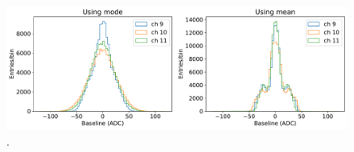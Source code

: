\documentclass[11pt,a4paper,english,oneside, pdf]{article}
\begin{document}
	\begin{figure}[!h]
		\begin{center}
			\includegraphics[width=\textwidth]{images/baselines_rel1_trigg_ch.pdf}
			\caption{.}
			\label{fig:baselines3}
		\end{center}
	\end{figure}	
	
	
	
\end{document}
